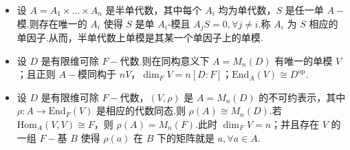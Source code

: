 \begin{theorem}
\begin{itemize}
    \item[(i)] 设 $A = A_1 \times \dots \times A_n$ 是半单代数，其中每个 $A_i$ 均为单代数，$S$ 是任一单 $A-\!\!$模.则存在唯一的 $A_i$ 使得 $S$ 是单 $A_i$-模且 $A_j S = 0, \forall j \neq i$.称 $A_i$ 为 $S$ 相应的单因子.从而，半单代数上单模是其某一个单因子上的单模.

    \item[(ii)] 设 $D$ 是有限维可除 $F-\!\!$代数.则在同构意义下 $A = M_n(D)$ 有唯一的单模 $V$；且正则 $A-\!\!$模同构于 $nV$，$\dim_F V = n[D:F]$；$\mathrm{End}_A(V) \cong D^{\mathrm{op}}$.

    \item[(iii)] 设 $D$ 是有限维可除 $F-\!\!$代数，$(V, \rho)$ 是 $A = M_n(D)$ 的不可约表示，其中 $\rho : A \to \mathrm{End}_F(V)$ 是相应的代数同态.则 $\rho(A) \cong M_n(D)$.若 $\mathrm{Hom}_A(V, V) \cong F$，则 $\rho(A) = M_n(F)$.此时 $\dim_F V = n$；并且存在 $V$ 的一组 $F-\!\!$基 $B$ 使得 $\rho(a)$ 在 $B$ 下的矩阵就是 $a, \forall a \in A$.
\end{itemize}
\end{theorem}
